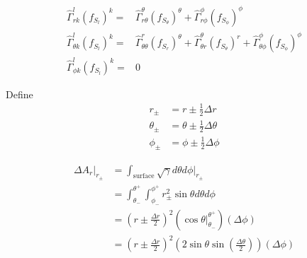 \begin{align}
\hat{\Gamma}^l_{rk}(f_{S_l})^k =& \hat{\Gamma}^\theta_{r\theta}(f_{S_\theta})^\theta + \hat{\Gamma}^\phi_{r\phi}(f_{S_\phi})^\phi \\
\hat{\Gamma}^l_{\theta k }(f_{S_l})^k =& \hat{\Gamma}^r_{\theta \theta}(f_{S_r})^\theta + \hat{\Gamma}^\theta_{\theta r}(f_{S_\theta})^r + \hat{\Gamma}^\phi_{\theta \phi}(f_{S_\phi})^\phi \\ %
\hat{\Gamma}^l_{\phi k}(f_{S_l})^k =& 0
\end{align}


Define
\begin{align}
r_\pm &= r \pm \frac{1}{2}\Delta r \\
\theta_\pm &= \theta \pm \frac{1}{2}\Delta \theta \\
\phi_\pm &= \phi \pm \frac{1}{2}\Delta \phi 
\end{align}

\begin{align}
\Delta A_r\Big|_{r_\pm} &= \int_{\text{surface}} \sqrt{\gamma} d\theta d\phi  \Big|_{r_\pm} \\
         &= \int_{\theta_-}^{\theta^+} \int_{\phi_-}^{\phi^+} r_\pm^2 \sin \theta d\theta d\phi \\
         &= \left( r \pm \frac{\Delta r}{2} \right)^2 \left( \cos \theta \Big|_{\theta_-}^{\theta^+} \right) \left( \Delta \phi \right)\\
         &=  \left( r \pm \frac{\Delta r}{2} \right)^2 \left( 2 \sin \theta \sin\left(\frac{\Delta \theta}{2}\right) \right) \left( \Delta \phi \right)
\end{align}


